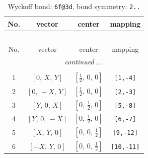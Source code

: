 \documentclass[fleqn,8pt]{jsarticle}
\begin{document}
\begin{longtable}{cccc}
\caption{Wyckoff bond: {\tt 6f@3d}, bond symmetry: {\tt 2..}}
 \\
 \hline \hline
No. & vector & center & mapping \\ \hline \endfirsthead

\multicolumn{3}{l}{\tablename\ \thetable{}} \\
 \hline \hline
No. & vector & center & mapping \\ \hline \endhead

 \hline \hline
\multicolumn{3}{r}{\footnotesize\it continued ...} \\ \endfoot

 \hline \hline
\multicolumn{3}{r}{} \\ \endlastfoot

1 & $\left[ 0,\, X,\, Y \right]$ & $\left[ \frac{1}{2},\, 0,\, 0 \right]$ & {\tt [1,-4]} \\ \hline
2 & $\left[ 0,\, - X,\, Y \right]$ & $\left[ \frac{1}{2},\, 0,\, 0 \right]$ & {\tt [2,-3]} \\ \hline
3 & $\left[ Y,\, 0,\, X \right]$ & $\left[ 0,\, \frac{1}{2},\, 0 \right]$ & {\tt [5,-8]} \\ \hline
4 & $\left[ Y,\, 0,\, - X \right]$ & $\left[ 0,\, \frac{1}{2},\, 0 \right]$ & {\tt [6,-7]} \\ \hline
5 & $\left[ X,\, Y,\, 0 \right]$ & $\left[ 0,\, 0,\, \frac{1}{2} \right]$ & {\tt [9,-12]} \\ \hline
6 & $\left[ - X,\, Y,\, 0 \right]$ & $\left[ 0,\, 0,\, \frac{1}{2} \right]$ & {\tt [10,-11]} \\
\end{longtable}
\renewcommand{\arraystretch}{1.2}
\end{document}
